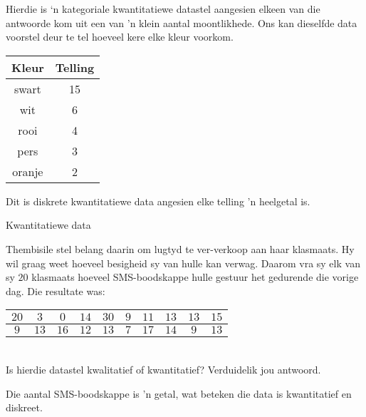 Hierdie is ‘n kategoriale kwantitatiewe datastel aangesien elkeen van die antwoorde kom uit een van ’n klein aantal moontlikhede. Ons kan dieselfde data voorstel deur te tel hoeveel kere elke kleur voorkom.

  \begin{center}
    \begin{tabular}{|c|c|}\hline
      
      \textbf{Kleur} & \textbf{Telling} \\ \hline

      swart & 15 \\
      wit & 6 \\
      rooi & 4 \\
      pers & 3 \\
      oranje & 2\\
    \hline
    \end{tabular}
  \end{center}

  Dit is diskrete kwantitatiewe data angesien elke telling 'n heelgetal is.

\begin{wex}{Kwantitatiewe data}
{Thembisile stel belang daarin om lugtyd te ver-verkoop aan haar klasmaats. Hy wil graag weet hoeveel besigheid sy van hulle kan verwag. Daarom vra sy elk van sy $20$ klasmaats hoeveel SMS-boodskappe hulle gestuur het gedurende die vorige dag. Die resultate was:
\\

    \begin{center}
      \begin{tabular}{|c|c|c|c|c|c|c|c|c|c|}\hline
        $20$ & $ 3$ & $ 0$ & $14$ & $30$ & $9$ & $11$ & $13$ & $13$ & $15$ \\ \hline
         $9$ & $13$ & $16$ & $12$ & $13$ & $7$ & $17$ & $14$ & $ 9$ & $13$ \\ \hline
        
      \end{tabular}
    \end{center}
    \vspace{8pt}\\

    Is hierdie datastel kwalitatief of kwantitatief? Verduidelik jou antwoord.
}{
  Die aantal SMS-boodskappe is 'n getal, wat beteken die data is kwantitatief en diskreet.
}
\end{wex}

